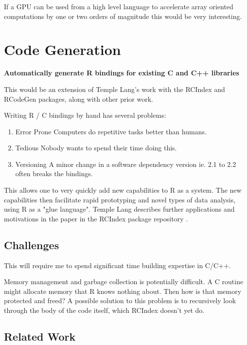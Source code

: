 \documentclass[12pt]{article}
\begin{document}
If a GPU can be used from a high level language to accelerate array
oriented computations by one or two orders of magnitude this would be very
interesting.

\section{Code Generation}

\textbf{Automatically generate R bindings for existing C and C++ libraries}

This would be an extension of Temple Lang's
work with the RCIndex \cite{R-RCIndex} and RCodeGen \cite{R-RCodegen}
packages, along with other prior work.

Writing R / C bindings by hand has several problems: 
\begin{enumerate}
    \item{Error Prone} Computers do repetitive tasks better than humans.
    \item{Tedious} Nobody wants to spend their time doing this.
    \item{Versioning} A minor change in a software dependency version ie. 2.1
        to 2.2 often breaks the bindings.
\end{enumerate}

This allows one to very quickly add new
capabilities to R as a system. The new capabilities then facilitate rapid
prototyping and novel types of data analysis, using R as a "glue language".
Temple Lang describes further applications and motivations in the paper in
the RCIndex package repository \cite{R-RCIndex}.

\subsection{Challenges}

This will require me to spend significant time building expertise in C/C++.

Memory management and garbage collection is potentially difficult. A C
routine might allocate memory that R knows nothing about. Then how is that
memory protected and freed? A possible solution to this problem is to
recursively look
through the body of the code itself, which RCIndex doesn't yet do.

\subsection{Related Work}
\end{document}
